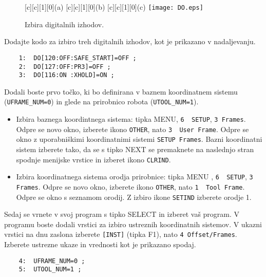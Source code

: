 \begin{figure}[!hbt]
	\centering
	[c][1][0]{(a)}
	[c][1][0]{(b)}		
	[c][1][0]{(c)}
	\texttt{[image: DO.eps]}
	\caption{Izbira digitalnih izhodov.}
	\label{fig:DO}
\end{figure}

Dodajte kodo za izbiro treh digitalnih izhodov, kot je prikazano v nadaljevanju.

\vspace{0.35cm}
\begin{mdframed}[backgroundcolor=orange!20, shadow=true,roundcorner=8pt]

\begin{verbatim}
	1:  DO[120:OFF:SAFE_START]=OFF ;
	2:  DO[127:OFF:PR3]=OFF ;
	3:  DO[116:ON :XHOLD]=ON ;
\end{verbatim}
	
\end{mdframed}

Dodali boste prvo točko, ki bo definirana v baznem koordinatnem sistemu (\verb*|UFRAME_NUM=0|) in glede na prirobnico robota (\verb*|UTOOL_NUM=1|).
\begin{itemize}
	\item Izbira baznega koordintnega sistema:  tipka MENU, \verb|6  SETUP|, \verb|3 Frames|. Odpre se novo okno, izberete ikono \verb|OTHER|, nato \verb|3  User Frame|. Odpre se okno z uporabniškimi koordinatnimi sistemi \verb|SETUP Frames|. Bazni koordinatni sistem izberete tako, da se s tipko NEXT se premaknete na naslednjo stran spodnje menijske vrstice in izberet ikono \verb*|CLRIND|.
	\item Izbira koordinatnega sistema orodja prirobnice: tipka MENU , \verb|6  SETUP|, \verb|3 Frames|. Odpre se novo okno, izberete ikono \verb|OTHER|, nato \verb|1  Tool Frame|.  Odpre se okno s seznamom orodij. Z izbiro ikone \verb*|SETIND| izberete orodje 1. 
\end{itemize}

Sedaj se vrnete v svoj program s tipko SELECT in izberet vaš program. V programu boste dodali vrstici za izbiro ustreznih koordinatnih sistemov. V ukazni vrstici na dnu zaslona izberete \verb|[INST]| (tipka F1), nato \verb*|4 Offset/Frames|. Izberete ustrezne ukaze in vrednosti kot je prikazano spodaj.

\vspace{0.35cm}
\begin{mdframed}[backgroundcolor=orange!20, shadow=true,roundcorner=8pt]
	
	\begin{verbatim}
	4:  UFRAME_NUM=0 ;
	5:  UTOOL_NUM=1 ;
	\end{verbatim}
	
\end{mdframed}

